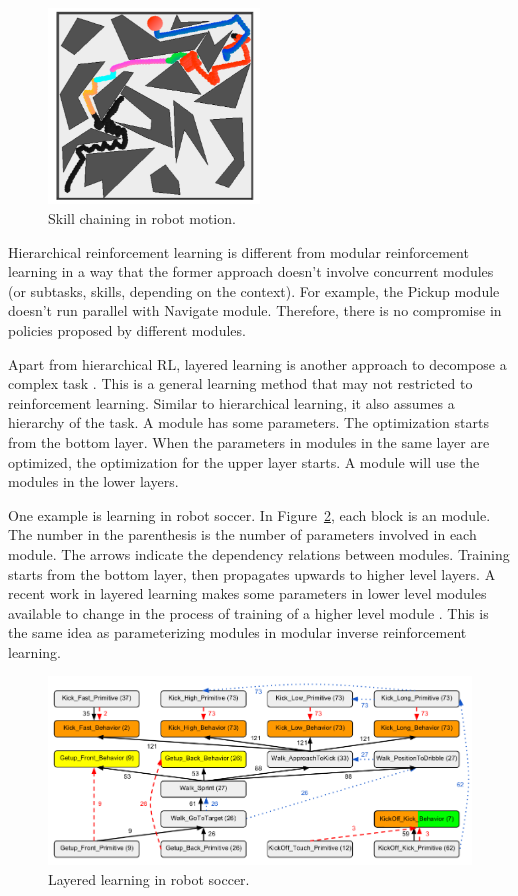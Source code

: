 \begin{figure}[h]
\centering
\includegraphics[width=0.5\textwidth]{skills}
\caption{Skill chaining in robot motion.}
\label{fig:skills}
\end{figure}

Hierarchical reinforcement learning is different from modular reinforcement
learning in a way that the former approach doesn't involve concurrent modules
(or subtasks, skills, depending on the context).
For example, the Pickup module doesn't run parallel with Navigate module.
Therefore, there is no compromise in policies proposed by different modules.

Apart from hierarchical RL, layered learning is another approach to decompose a
complex task \cite{stone2000layered}. This is a general learning method that may
not restricted to reinforcement learning. Similar to hierarchical learning, it
also assumes a hierarchy of the task. A module has some parameters. The
optimization starts from the bottom layer. When the parameters in modules in
the same layer are optimized, the optimization for the upper layer starts. A
module will use the modules in the lower layers.

One example is learning in robot soccer. In Figure~\ref{fig:soccer}, each block
is an module. The number in the parenthesis is the number of parameters involved
in each module. The arrows indicate the dependency relations between modules.
Training starts from the bottom layer, then propagates upwards to higher level
layers.
A recent work in layered learning makes some parameters in lower level modules
available to change in the process of training of a higher level module
\cite{macalpine2015ut}. This is the same idea as parameterizing modules in
modular inverse reinforcement learning. 

\begin{figure}[h]
\centering
\includegraphics[width=\textwidth]{layered}
\caption{Layered learning in robot soccer. \cite{macalpine2015ut}}
\label{fig:soccer}
\end{figure}

